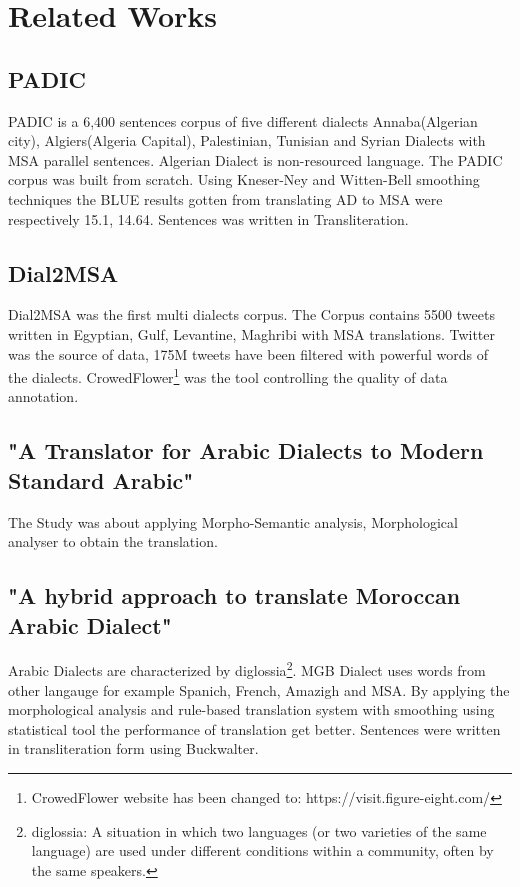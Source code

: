 \documentclass[paper=a4, fontsize=11pt]{scrartcl}
\numberwithin{equation}{section}		%
\numberwithin{figure}{section}			%
\numberwithin{table}{section}				%
\begin{document}
\section{Related Works}

\subsection{PADIC\cite{meftouh2015machine}}
PADIC\cite{meftouh2015machine} is a 6,400 sentences corpus of five different dialects Annaba(Algerian city), Algiers(Algeria Capital), Palestinian, Tunisian and Syrian Dialects with MSA parallel sentences. Algerian Dialect is non-resourced language. The PADIC corpus was built from scratch. Using Kneser-Ney and Witten-Bell smoothing techniques the BLUE results gotten  from translating AD to MSA were respectively 15.1, 14.64. Sentences was written in Transliteration\cite{meftouh2015machine}. 
\subsection{Dial2MSA \cite{mubarak2018dial2msa}}
Dial2MSA\cite{mubarak2018dial2msa} was the first multi dialects corpus. The Corpus contains 5500 tweets written in Egyptian, Gulf, Levantine, Maghribi with MSA translations. Twitter was the source of data, 175M tweets have been filtered with powerful words of the dialects. CrowedFlower\footnote{CrowedFlower website has been changed to: https://visit.figure-eight.com/} was the tool controlling the quality of data annotation\cite{mubarak2018dial2msa}.
\subsection{ "A Translator for Arabic Dialects to Modern Standard Arabic" \cite{mahgouba2015translator}}
The Study \cite{mahgouba2015translator} was about applying Morpho-Semantic analysis, Morphological analyser to obtain the translation.
\subsection{"A hybrid approach to translate Moroccan Arabic Dialect" \cite{tachicart2014hybrid}}
Arabic Dialects are characterized by diglossia\footnote{diglossia: A situation in which two languages (or two varieties of the same language) are used under different conditions within a community, often by the same speakers.}. MGB Dialect uses words from other langauge for example Spanich, French, Amazigh and MSA. By applying the morphological analysis and rule-based translation system with smoothing using statistical tool the performance of translation get better. Sentences were written in transliteration form using Buckwalter.  
\end{document}
